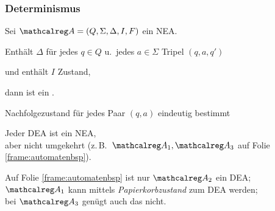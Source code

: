     \begin{frame}
      \frametitle{Determinismus}
      
      \begin{Definition}
        Sei $\Aut{A} = (Q,\Sigma,\Delta,I,F)$ ein NEA.
        \par\smallskip
        Enthält $\Delta$ für jedes $q \in Q$ u.\ jedes $a \in \Sigma$
         Tripel $(q,a,q')$
        \par
        und enthält $I$  Zustand,
        \par\smallskip
        dann ist  ein .
      \end{Definition}
      
      \begin{Itemize}
        \item<2->[$\leadsto$]
          Nachfolgezustand für jedes Paar $(q,a)$ eindeutig bestimmt
          \par\bigskip
        \item<3->
          Jeder DEA ist ein NEA,\\
          aber nicht umgekehrt %
          {\small (z.\,B.\ $\Aut{A}_1, \Aut{A}_3$ auf Folie \ref{frame:automatenbsp})}.
        \par\smallskip
        \item<4->
          Auf Folie \ref{frame:automatenbsp} ist nur $\Aut{A}_2$ ein DEA;\\
          $\Aut{A}_1$ kann mittels \emph{Papierkorbzustand} zum DEA werden;  \Tafel \\
          bei $\Aut{A}_3$ genügt auch das nicht.
      \end{Itemize}

    \end{frame}


